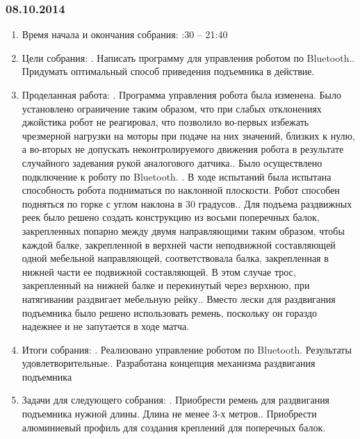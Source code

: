 \documentclass[12pt]{article}
\begin{document}
	      \subsubsection{08.10.2014}
	      \begin{enumerate}
	      	\item Время начала и окончания собрания:
	      	:30 – 21:40
	      	\item Цели собрания:
	      	.	Написать программу для управления роботом по Bluetooth..	Придумать оптимальный способ приведения подъемника в действие.\newline
	      	\item Проделанная работа:
	      	.	Программа управления робота была изменена. Было установлено ограничение таким образом, что при слабых отклонениях джойстика робот не реагировал, что позволило во-первых избежать чрезмерной нагрузки на моторы при подаче на них значений, близких к нулю, а во-вторых не допускать неконтролируемого движения робота в результате случайного задевания рукой аналогового датчика..	Было осуществлено подключение к роботу по Bluetooth. .	В ходе испытаний была испытана способность робота подниматься по наклонной плоскости. Робот  способен подняться по горке с углом наклона в 30 градусов..	Для подъема раздвижных реек было решено создать конструкцию из восьми поперечных балок, закрепленных попарно между двумя направляющими таким образом, чтобы каждой балке, закрепленной в верхней части неподвижной составляющей одной мебельной направляющей, соответствовала балка, закрепленная в нижней части ее подвижной составляющей. В этом случае трос, закрепленный на нижней балке и перекинутый через верхнюю, при натягивании раздвигает мебельную рейку..	Вместо лески для раздвигания подъемника было решено использовать ремень, поскольку он гораздо надежнее и не запутается в ходе матча.
	      	\newline
	      	\item Итоги собрания:
	      	.	Реализовано управление роботом по Bluetooth. Результаты удовлетворительные..	Разработана концепция механизма раздвигания подъемника
	      	\newline
	      	\item Задачи для следующего собрания:
	      	.	Приобрести ремень для раздвигания подъемника нужной длины. Длина не менее 3-х метров..	Приобрести алюминиевый профиль для создания креплений для поперечных балок.	      	
	      \end{enumerate}
	      \newpage
\end{document}
